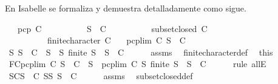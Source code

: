 \begin{isabellebody}
\begin{isamarkuptext}
  En Isabelle se formaliza y demuestra detalladamente como sigue.%
\end{isamarkuptext}\isamarkuptrue%
\isamarkupfalse%
\isanewline
\ \ \ {\isachardoublequoteopen}pcp\ C{\isachardoublequoteclose}\isanewline
\ \ \ \ \ \ \ \ \ \ {\isachardoublequoteopen}S\ {\isasymin}\ C{\isachardoublequoteclose}\isanewline
\ \ \ \ \ \ \ \ \ \ {\isachardoublequoteopen}subset{\isacharunderscore}closed\ C{\isachardoublequoteclose}\isanewline
\ \ \ \ \ \ \ \ \ \ {\isachardoublequoteopen}finite{\isacharunderscore}character\ C{\isachardoublequoteclose}\isanewline
\ \ \ {\isachardoublequoteopen}pcp{\isacharunderscore}lim\ C\ S\ {\isasymin}\ C{\isachardoublequoteclose}\ \isanewline
%
\isadelimproof
%
\endisadelimproof
%
\isatagproof
{}\isamarkupfalse%
\ {\isacharminus}\isanewline
\ \ \isamarkupfalse%
\ {\isachardoublequoteopen}{\isasymforall}S{\isachardot}\ S\ {\isasymin}\ C\ {\isasymlongleftrightarrow}\ {\isacharparenleft}{\isasymforall}S{\isacharprime}\ {\isasymsubseteq}\ S{\isachardot}\ finite\ S{\isacharprime}\ {\isasymlongrightarrow}\ S{\isacharprime}\ {\isasymin}\ C{\isacharparenright}{\isachardoublequoteclose}\isanewline
\ \ \ \ \isamarkupfalse%
\ assms{\isacharparenleft}{}{\isacharparenright}\ \isamarkupfalse%
\ finite{\isacharunderscore}character{\isacharunderscore}def\ \isamarkupfalse%
\ this\isanewline
\ \ \isamarkupfalse%
\ \isamarkupfalse%
\ FC{}{\isacharcolon}{\isachardoublequoteopen}pcp{\isacharunderscore}lim\ C\ S\ {\isasymin}\ C\ {\isasymlongleftrightarrow}\ {\isacharparenleft}{\isasymforall}S{\isacharprime}\ {\isasymsubseteq}\ {\isacharparenleft}pcp{\isacharunderscore}lim\ C\ S{\isacharparenright}{\isachardot}\ finite\ S{\isacharprime}\ {\isasymlongrightarrow}\ S{\isacharprime}\ {\isasymin}\ C{\isacharparenright}{\isachardoublequoteclose}\isanewline
\ \ \ \ \isamarkupfalse%
\ {\isacharparenleft}rule\ allE{\isacharparenright}\isanewline
\ \ \isamarkupfalse%
\ SC{\isacharcolon}{\isachardoublequoteopen}{\isasymforall}S\ {\isasymin}\ C{\isachardot}\ {\isasymforall}S{\isacharprime}{\isasymsubseteq}S{\isachardot}\ S{\isacharprime}\ {\isasymin}\ C{\isachardoublequoteclose}\isanewline
\ \ \ \ \isamarkupfalse%
\ assms{\isacharparenleft}{}{\isacharparenright}\ \isamarkupfalse%
\ subset{\isacharunderscore}closed{\isacharunderscore}def\ \isamarkupfalse%

\end{isabellebody}
